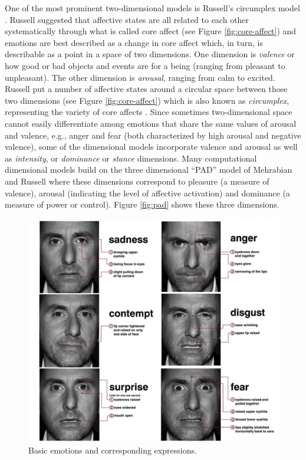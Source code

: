 \documentclass[12pt]{report}
\begin{document}
One of the most prominent two-dimensional models is Russell's circumplex model
\cite{russell:circumplex-affect}. Russell suggested that affective states are
all related to each other systematically through what is called core affect
\cite{russell:circumplex-affect,russell:core-affect} (see Figure
\ref{fig:core-affect}) and emotions are best described as a change in core
affect which, in turn, is describable as a point in a space of two dimensions.
One dimension is \textit{valence} or how good or bad objects and events are for
a being (ranging from pleasant to unpleasant). The other dimension is
\textit{arousal}, ranging from calm to excited. Russell put a number of
affective states around a circular space between those two dimensions (see
Figure \ref{fig:core-affect}) which is also known as \textit{circumplex},
representing the variety of core affects
\cite{russell:circumplex-affect,russell:core-affect}. Since sometimes
two-dimensional space cannot easily differentiate among emotions that share the
same values of arousal and valence, e.g., anger and fear (both characterized by
high arousal and negative valence), some of the dimensional models incorporate
valence and arousal as well as \textit{intensity}, or \textit{dominance} or
\textit{stance} dimensions. Many computational dimensional models build on the
three dimensional “PAD” model of Mehrabian and Russell
\cite{mehrabian-russell:pad} where these dimensions correspond to pleasure (a
measure of valence), arousal (indicating the level of affective activation) and
dominance (a measure of power or control). Figure \ref{fig:pad} shows these
three dimensions.

\begin{figure}[tbh]
  \center
  \includegraphics[width=.9\textwidth]{figure/basic-emotions.jpg}
  \caption{Basic emotions and corresponding expressions.}
  \label{fig:basic-emotions}
\end{figure}
\end{document}
